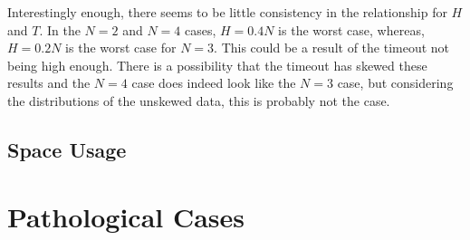 \documentclass{sig-alternate-05-2015}
\begin{document}
Interestingly enough, there seems to be little consistency in the relationship
for $H$ and $T$. In the $N=2$ and $N=4$ cases, $H=0.4N$ is the worst case, whereas,
$H=0.2N$ is the worst case for $N=3$. This could be a result of the timeout not being
high enough. There is a possibility that the timeout has skewed these results and
the $N=4$ case does indeed look like the $N=3$ case, but considering the distributions
of the unskewed data, this is probably not the case.

\subsection{Space Usage}

\section{Pathological Cases}
\end{document}
